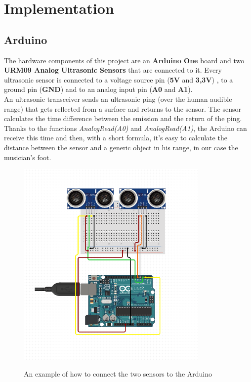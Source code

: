 \documentclass{article}
\begin{document}
\section{Implementation}

\subsection{Arduino}

The hardware components of this project are an \textbf{Arduino One} board and two \textbf{URM09 Analog Ultrasonic Sensors} that are connected to it. Every ultrasonic sensor is connected to a voltage source pin (\textbf{5V} and \textbf{3,3V}) , to a ground pin (\textbf{GND}) and to an analog input pin (\textbf{A0} and \textbf{A1}). 
\\An ultrasonic transceiver sends an ultrasonic ping (over the human audible range) that gets reflected from a surface and returns to the sensor. The sensor calculates the time difference between the emission and the return of the ping. Thanks to the functions \textit{AnalogRead(A0)} and \textit{AnalogRead(A1)}, the Arduino can receive this time and then, with a short formula, it’s easy to calculate the distance between the sensor and a generic object in his range, in our case the musician’s foot.

\begin{figure}
{\includegraphics[width=9.35cm]{Arduino Schematics.PNG}}\par
    \caption{An example of how to connect the two sensors to the Arduino}
\end{figure}
\end{document}
